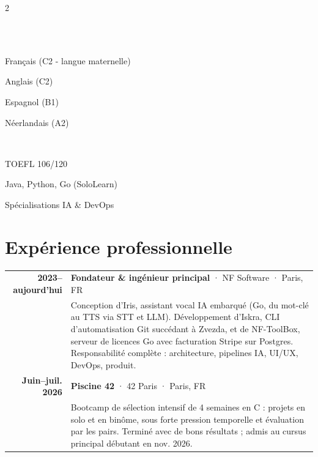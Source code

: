 \documentclass[lighthipster]{simplehipstercv}
\begin{document}
\begin{paracol}{2}
{\vspace{1em}

\\[0.5em]




\bigskip

\\[0.5em]

Français (C2 - langue maternelle)

Anglais (C2)

Espagnol (B1)

Néerlandais (A2)

\bigskip

\\[0.5em]

{\footnotesize TOEFL 106/120

Java, Python, Go (SoloLearn)

Spécialisations IA \& DevOps}

\vfill

}
\switchcolumn

\small
\section*{Expérience professionnelle}

\begin{tabular}{r| p{}}
    \textbf{2023--aujourd'hui} & \textbf{Fondateur \& ingénieur principal} · \textcolor{cvgreen}{NF Software} · Paris, FR \\
    & {\footnotesize Conception d'Iris, assistant vocal IA embarqué (Go, du mot-clé au TTS via STT et LLM). Développement d'Iskra, CLI d'automatisation Git succédant à Zvezda, et de NF-ToolBox, serveur de licences Go avec facturation Stripe sur Postgres. Responsabilité complète : architecture, pipelines IA, UI/UX, DevOps, produit.} \\[0.8em]

    \textbf{Juin--juil. 2026} & \textbf{Piscine 42} · \textcolor{cvgreen}{42 Paris} · Paris, FR \\
    & {\footnotesize Bootcamp de sélection intensif de 4 semaines en C : projets en solo et en binôme, sous forte pression temporelle et évaluation par les pairs. Terminé avec de bons résultats ; admis au cursus principal débutant en nov. 2026.} \\[0.8em]


\end{tabular}
\end{paracol}
\end{document}
